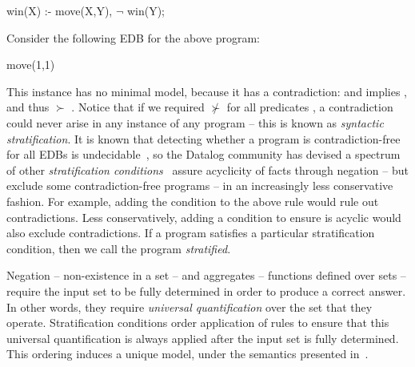 \begin{Dedalus}
win(X) :- move(X,Y), \(\lnot\) win(Y);
\end{Dedalus}

\noindent{}Consider the following EDB for the above program:

\begin{Dedalus}
move(1,1)
\end{Dedalus}

This instance has no minimal model, because it has a contradiction:
 and  implies ,
and thus  $\succ$ .  Notice that if
we required  $\not\succ$  for all predicates
, a contradiction could never arise in any instance of any program
-- this is known as {\em syntactic stratification}.  It is known that detecting
whether a program is contradiction-free for all EDBs is
undecidable~\cite{papa-yanna}, so the Datalog community has devised a spectrum
of other {\em stratification conditions}~\cite{local-strat, ross-syntactic,
modular, weak-strat} assure acyclicity of facts through negation -- but exclude
some contradiction-free programs -- in an increasingly less conservative
fashion. For example, adding the condition  to the above rule
would rule out contradictions.  Less conservatively, adding a condition to
ensure  is acyclic would also exclude contradictions.  If a
program satisfies a particular stratification condition, then we call the
program {\em stratified}.

Negation -- non-existence in a set -- and aggregates -- functions defined over
sets -- require the input set to be fully determined in order to produce a
correct answer.  In other words, they require {\em universal quantification}
over the set that they operate.  Stratification conditions order application of
rules to ensure that this universal quantification is always applied after the
input set is fully determined.  This ordering induces a unique model, under
the semantics presented in~\cite{wellfounded}.

